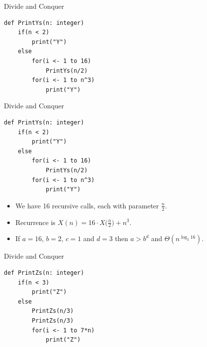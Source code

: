 \documentclass{beamer}
\begin{document}
\begin{frame}[fragile]{Divide and Conquer}
    \begin{center}
    \begin{minipage}{0.5\textwidth}
    \begin{verbatim}
def PrintYs(n: integer)
    if(n < 2)
        print("Y")
    else
        for(i <- 1 to 16)
            PrintYs(n/2)
        for(i <- 1 to n^3)
            print("Y")
    \end{verbatim}
    \end{minipage}
    \end{center}
\end{frame}

\begin{frame}[fragile]{Divide and Conquer}
    \begin{center}
    \begin{minipage}{0.5\textwidth}
    \begin{verbatim}
def PrintYs(n: integer)
    if(n < 2)
        print("Y")
    else
        for(i <- 1 to 16)
            PrintYs(n/2)
        for(i <- 1 to n^3)
            print("Y")
    \end{verbatim}
    \end{minipage}
    \end{center}
    
    \begin{itemize}
        \item We have 16 recursive calls, each with parameter $\frac{n}{2}$.
        \item Recurrence is $X(n) = 16 \cdot X \Big(\frac{n}{2}\Big) + n^3$.
        \item If $a = 16$, $b = 2$, $c = 1$ and $d = 3$ then $a > b^d$ and $\Theta (n^{\log_2 16})$.
    \end{itemize}
\end{frame}

\begin{frame}[fragile]{Divide and Conquer}
    \begin{center}
    \begin{minipage}{0.5\textwidth}
    \begin{verbatim}
def PrintZs(n: integer)
    if(n < 3)
        print("Z")
    else
        PrintZs(n/3)
        PrintZs(n/3)
        for(i <- 1 to 7*n)
            print("Z")
    \end{verbatim}
    \end{minipage}
    \end{center}
\end{frame}
\end{document}
